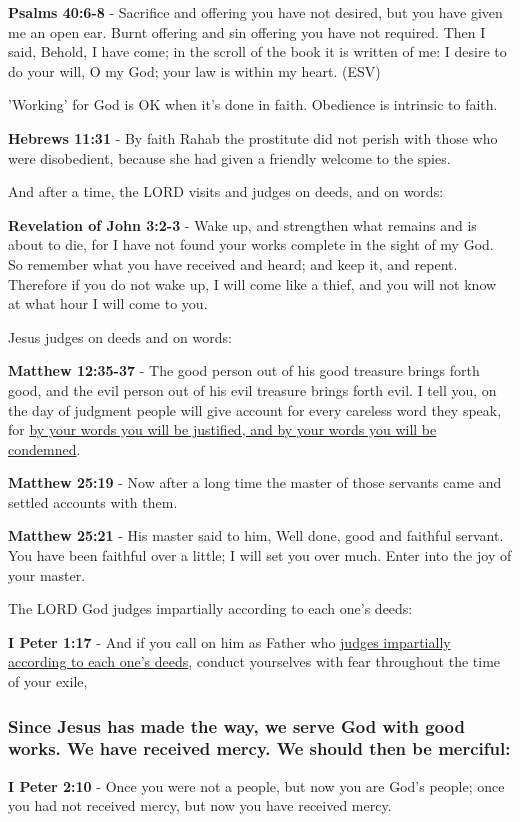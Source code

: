 \documentclass[11pt]{article}
\begin{document}
\textbf{Psalms 40:6-8} - Sacrifice and offering you have not desired, but you have given me an open ear. Burnt offering and sin offering you have not required. Then I said, Behold, I have come; in the scroll of the book it is written of me: I desire to do your will, O my God; your law is within my heart. (ESV)

'Working' for God is OK when it's done in faith.
Obedience is intrinsic to faith.

\textbf{Hebrews 11:31} - By faith Rahab the prostitute did not perish with those who were disobedient, because she had given a friendly welcome to the spies.

And after a time, the LORD visits and judges on deeds, and on words:

\textbf{Revelation of John 3:2-3} - Wake up, and strengthen what remains and is about to die, for I have not found your works complete in the sight of my God. So remember what you have received and heard; and keep it, and repent. Therefore if you do not wake up, I will come like a thief, and you will not know at what hour I will come to you.

Jesus judges on deeds and on words:

\textbf{Matthew 12:35-37} - The good person out of his good treasure brings forth good, and the evil person out of his evil treasure brings forth evil. I tell you, on the day of judgment people will give account for every careless word they speak, for \uline{by your words you will be justified, and by your words you will be condemned}.

\textbf{Matthew 25:19} - Now after a long time the master of those servants came and settled accounts with them.

\textbf{Matthew 25:21} - His master said to him, Well done, good and faithful servant. You have been faithful over a little; I will set you over much. Enter into the joy of your master.

The LORD God judges impartially according to each one's deeds:

\textbf{I Peter 1:17} - And if you call on him as Father who \uline{judges impartially according to each one's deeds}, conduct yourselves with fear throughout the time of your exile,

\subsubsection{Since Jesus has made the way, we serve God with good works. We have received mercy. We should then be merciful:}
\label{sec:org7fdcf34}
\textbf{I Peter 2:10} - Once you were not a people, but now you are God's people; once you had not received mercy, but now you have received mercy.
\end{document}
